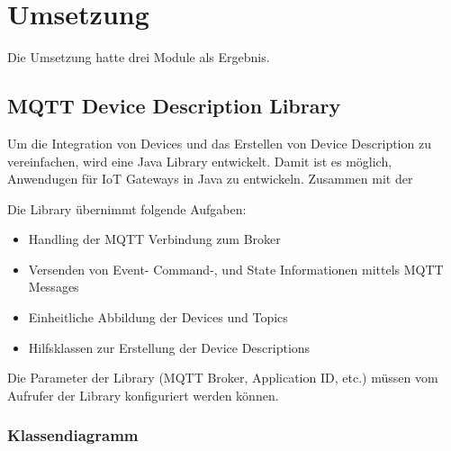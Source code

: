 \chapter{Umsetzung}
\label{chap:umsetzung}

Die Umsetzung hatte drei Module als Ergebnis.

\section{MQTT Device Description Library}
Um die Integration von Devices und das Erstellen von Device Description zu vereinfachen, wird eine Java Library entwickelt. Damit ist es möglich, Anwendugen für IoT Gateways in Java zu entwickeln. Zusammen mit der 

Die Library übernimmt folgende Aufgaben:
\begin{itemize}
\item Handling der MQTT Verbindung zum Broker
\item Versenden von Event- Command-, und State Informationen mittels MQTT Messages
\item Einheitliche Abbildung der Devices und Topics
\item Hilfsklassen zur Erstellung der Device Descriptions
\end{itemize}

Die Parameter der Library (MQTT Broker, Application ID, etc.) müssen vom Aufrufer der Library konfiguriert werden können.


\subsection{Klassendiagramm}

